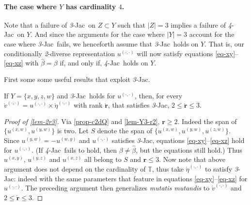 \documentclass[12pt,a4paper,twoside]{article}
\newcommand{\mbbt}{{\mathds {T}}}
\newcommand{\xy}{{(x, y)}}
\newcommand{\yz}{{(y,z)}}
\newcommand{\xz}{{(x,z)}}
\newcommand{\xw}{{(x,w)}}
\newcommand{\yw}{{(y,w)}}
\newcommand{\wy}{{(w,y)}}
\newcommand{\zw}{(z,w)}
\newcommand{\dd}{{(\cdot,\cdot)}}
\newcommand{\fourjac}{\textup{\textit{4}-Jac}}
\newcommand{\threejac}{\textup{\textit{3}-Jac}}
\begin{document}
\begin{appendices}
\paragraph{The case where $Y$ has cardinality $4$.\hskip-4pt} Note that a
failure of \threejac\ on $Z \subset Y$ such that $\lvert Z \rvert = 3$ implies
a failure of \fourjac\ on $Y$. And since the arguments for the case where
$\lvert Y \rvert = 3$ account for the case where \threejac\ fails, we
henceforth assume that \threejac\ holds on $Y$. That is, our conditionally
\emph{2}-diverse representation $u^{\dd}$ will now satisfy equations
\eqref{eq-xy}--\eqref{eq-xz} with $\hat{\beta} = \beta$ if, and only if,
\fourjac\ holds on $Y$.

First some some useful results that exploit \threejac.
\begin{proposition}\label{lem-2r3}
  If $Y = \{x, y, z, w\}$ and \threejac\ holds for $u^{\dd}$, then, for every
  $\acute{v}^{\dd} = u^{\dd} \times \acute{\eta}^{\dd}$ with rank
  $\acute{\mathbf r}$, that satisfies \threejac,
  $2\leq \acute{\mathbf r}\leq 3$.
\end{proposition}
\begin{proof}[Proof of \cref{lem-2r3}]
  Via \cref{prop-c2dQ} and \cref{lem-Y3-r2}, $\mathbf r \geq 2$. Indeed the
  span of $\{u^{\xw}, u^{\yw}\}$ is two. Let $S$ denote the span of
  $\{u^{\xw}, u^{\yw} ,u^{\zw}\}$.  Since $u^{\yw} = - u^{\wy}$ and $u^{\dd}$
  satisfies \threejac, equations \eqref{eq-xy}--\eqref{eq-xz} hold for
  $u^{\dd}$.  (If \fourjac\ fails to hold, then $\beta \neq \hat \beta$, but the
  equations still hold.) Thus $u^{\xy}$, $u^{\yz}$ and $u^{\xz}$ all belong to
  $S$ and $\mathbf{r} \leq 3$. Now note that above argument does not depend on
  the cardinality of $\mbbt$, thus take $\acute{\eta}^{\dd}$ to
  satisfy \threejac: indeed with the same parameters that feature in
  equations \eqref{eq-xy}--\eqref{eq-xz} for $u^{\dd}$. The preceding
  argument then {generalizes} \emph{mutatis mutandis} to $\acute{v}^{\dd}$ and
  $2 \leq \acute{\mathbf r} \leq 3$.
\end{proof}


\end{appendices}
\end{document}
